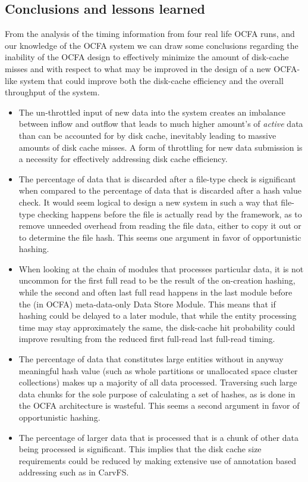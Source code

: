 \subsection{Conclusions and lessons learned}
From the analysis of the timing information from four real life OCFA runs, and our knowledge of the OCFA system we can draw some conclusions regarding the inability of the OCFA design to effectively minimize the amount of disk-cache misses and with respect to what may be improved in the design of a new OCFA-like system that could improve both the disk-cache efficiency and the overall throughput of the system.
\begin{itemize}
\item The un-throttled input of new data into the system creates an imbalance between inflow and outflow that leads to much higher amount's of \emph{active} data than can be accounted for by disk cache, inevitably leading to massive amounts of disk cache misses. A form of throttling for new data submission is a necessity for effectively addressing disk cache efficiency.
\item The percentage of data that is discarded after a file-type check is significant when compared to the percentage of data that is discarded after a hash value check. It would seem logical to design a new system in such a way that file-type checking happens before the file is actually read by the framework, as to remove unneeded overhead from reading the file data, either to copy it out or to determine the file hash. This seems one argument in favor of opportunistic hashing. 
\item When looking at the chain of modules that processes particular data, it is not uncommon for the first full read to be the result of the on-creation hashing, while the second and often last full read happens in the last module before the (in OCFA) meta-data-only Data Store Module. This means that if hashing could be delayed to a later module, that while the entity processing time may stay approximately the same, the disk-cache hit probability could improve resulting from the reduced first full-read last full-read timing. 
\item The percentage of data that constitutes large entities without in anyway meaningful hash value (such as whole partitions or unallocated space cluster collections) makes up a majority of all data processed. Traversing such large data chunks for the sole purpose of calculating a set of hashes, as is done in the OCFA architecture is wasteful. This seems a second argument in favor of opportunistic hashing.
\item The percentage of larger data that is processed that is a chunk of other data being processed is significant. This implies that the disk cache size requirements could be reduced by making extensive use of annotation based addressing such as in CarvFS.
\end{itemize}
